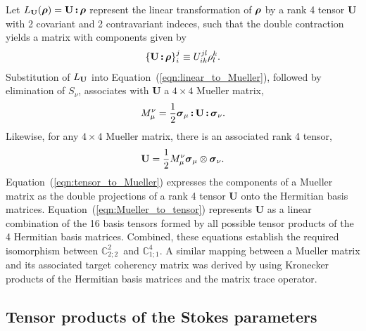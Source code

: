 \documentclass[twocolumn]{aastex6}
\newcommand{\mbf}[1]{\mbox{\boldmath $#1$}}
\newcommand{\Eqn}[1]{Equation~(\ref{eqn:#1})}
\newcommand{\rankfour}{\ensuremath{\mathbb{C}^2_{2;2}}}
\newcommand{\ranktwo}{\ensuremath{\mathbb{C}^4_{1;1}}}
\newcommand{\irow}{\mu} \newcommand{\icol}{\nu}
\newcommand{\outerBilinear}[2]{\ensuremath{{#1}\otimes{#2}}}
\newcommand{\dc}[2]{\ensuremath{{#1}\,\mbf{:}\,{#2}}}
\newcommand{\pauli}[1]{\ensuremath{\mbf{\sigma}_{#1}}}
\begin{document}
Let $L_{\bf U}(\mbf{\rho}) = \dc{\bf U}{\mbf\rho}$ represent the
linear transformation of $\mbf\rho$ by a rank 4 tensor {\bf U} with 2
covariant and 2 contravariant indeces, such that the double contraction 
yields a matrix with components given by
%
\begin{equation}
\left\{ \dc{\bf U}{\mbf\rho} \right\}_i^j
  \equiv U_{ik}^{jl} \rho_l^k.
\label{eqn:double_contraction}
\end{equation}
%
Substitution of $L_{\bf U}$ into \Eqn{linear_to_Mueller}, followed by
elimination of $S_\icol$, associates with {\bf U} a 
$4\times4$ Mueller matrix,
%
\begin{equation}
M_\irow^\icol 
= \frac{1}{2} \dc{\pauli{\irow}}{\dc{\bf U}{\pauli{\icol}}}.
\label{eqn:tensor_to_Mueller}
\end{equation}
%
Likewise, for any $4\times4$ Mueller matrix, there is an associated
rank 4 tensor,
%
\begin{equation}
{\bf U} = \frac{1}{2} M_\irow^\icol \outerBilinear{\pauli{\irow}}{\pauli{\icol}}.
\label{eqn:Mueller_to_tensor}
\end{equation}
%
\Eqn{tensor_to_Mueller} expresses the components of a Mueller matrix
as the double projections of a rank 4 tensor {\bf U} onto the Hermitian
basis matrices.
%
\Eqn{Mueller_to_tensor} represents {\bf U} as a linear combination of
the 16 basis tensors formed by all possible tensor products of the 4
Hermitian basis matrices.
%
Combined, these equations establish the required isomorphism between
\rankfour\ and \ranktwo.
%
A similar mapping between a Mueller matrix and its associated target
coherency matrix was derived by \cite{clo86} using Kronecker
products of the Hermitian basis matrices and the matrix trace
operator.


\subsection{Tensor products of the Stokes parameters}
\end{document}
